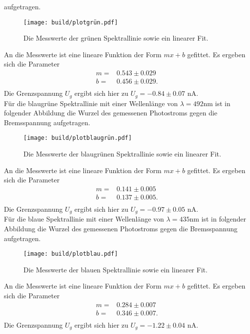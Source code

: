 aufgetragen.
\begin{figure}[H]
  \centering
  \texttt{[image: build/plotgrün.pdf]}
  \label{fig:plotgrün}
  \caption{Die Messwerte der grünen Spektrallinie sowie ein linearer Fit.}
\end{figure}
\noindent
An die Messwerte ist eine lineare Funktion der Form $mx +b$ gefittet. Es ergeben
sich die Parameter
\begin{align*}
  m = & 0.543 \pm 0.029 \\
  b = & 0.456 \pm 0.029. \\
\end{align*}
Die Grenzspannung $U_g$ ergibt sich hier zu $ U_g = -0.84 \pm 0.07$ \si{\nano\ampere}. \\
\noindent
Für die blaugrüne Spektrallinie mit einer Wellenlänge von $\lambda = 492 \si{\nano\meter}$
ist in folgender Abbildung die Wurzel des gemessenen Photostroms gegen die Bremsspannung
aufgetragen.
\begin{figure}[H]
  \centering
  \texttt{[image: build/plotblaugrün.pdf]}
  \label{fig:plotblaugrün}
  \caption{Die Messwerte der blaugrünen Spektrallinie sowie ein linearer Fit.}
\end{figure}
\noindent
An die Messwerte ist eine lineare Funktion der Form $mx +b$ gefittet. Es ergeben
sich die Parameter
\begin{align*}
  m = & 0.141 \pm 0.005 \\
  b = & 0.137 \pm 0.005.\\
\end{align*}
Die Grenzspannung $U_g$ ergibt sich hier zu $ U_g = -0.97 \pm 0.05$ \si{\nano\ampere}. \\
\noindent
Für die blaue Spektrallinie mit einer Wellenlänge von $\lambda = 435 \si{\nano\meter}$ \cite{AP02}
ist in folgender Abbildung die Wurzel des gemessenen Photostroms gegen die Bremsspannung
aufgetragen.
\begin{figure}[H]
  \centering
  \texttt{[image: build/plotblau.pdf]}
  \label{fig:plotblau}
  \caption{Die Messwerte der blauen Spektrallinie sowie ein linearer Fit.}
\end{figure}
\noindent
An die Messwerte ist eine lineare Funktion der Form $mx +b$ gefittet. Es ergeben
sich die Parameter
\begin{align*}
  m = & 0.284 \pm 0.007 \\
  b = & 0.346 \pm 0.007.\\
\end{align*}
Die Grenzspannung $U_g$ ergibt sich hier zu $ U_g = -1.22 \pm 0.04$ \si{\nano\ampere}. \\
